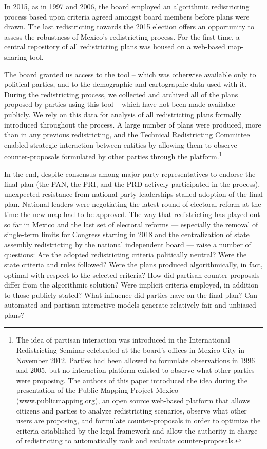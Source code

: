\documentclass[letter,12pt]{article}
\begin{document}
In 2015, as in 1997 and 2006, the board employed an algorithmic redistricting process based upon criteria agreed amongst board members before plans were drawn. The last redistricting towards the 2015 election offers an opportunity to assess the robustness of Mexico's redistricting process. For the first time, a central repository of all redistricting plans was housed on a web-based map-sharing tool. 

The board granted us access to the tool -- which was otherwise available only to political parties, and to the demographic and cartographic data used with it. During the redistricting process, we collected and archived all of the plans proposed by parties using this tool -- which have not been made available publicly. We rely on this data for analysis of all redistricting plans formally introduced throughout the process. A large number of plans were produced, more than in any previous redistricting, and the Technical Redistricting Committee enabled strategic interaction between entities by allowing them to observe counter-proposals formulated by other parties through the platform.\footnote{The idea of partisan interaction was introduced in the International Redistricting Seminar celebrated at the board's offices in Mexico City in November 2012. Parties had been allowed to formulate observations in 1996 and 2005, but no interaction platform existed to observe what other parties were proposing. The authors of this paper introduced the idea during the presentation of the Public Mapping Project Mexico (\url{www.publicmapping.org}), an open source web-based platform that allows citizens and parties to analyze redistricting scenarios, observe what other users are proposing, and formulate counter-proposals in order to optimize the criteria established by the legal framework and allow the authority in charge of redistricting to automatically rank and evaluate counter-proposals.} 

In the end, despite consensus among major party representatives to endorse the final plan (the PAN, the PRI, and the PRD actively participated in the process), unexpected resistance from national party leaderships stalled adoption of the final plan. National leaders were negotiating the latest round of electoral reform at the time the new map had to be approved. The way that redistricting has played out so far in Mexico and the last set of electoral reforms --- especially the removal of single-term limits for Congress starting in 2018 and the centralization of state assembly redistricting by the national independent board --- raise a number of questions: Are the adopted redistricting criteria politically neutral? Were the state criteria and rules followed? Were the plans produced algorithmically, in fact, optimal with respect to the selected criteria? How did partisan counter-proposals differ from the algorithmic solution? Were implicit criteria employed, in addition to those publicly stated? What influence did parties have on the final plan? Can automated and partisan interactive  models generate relatively fair and unbiased plans?
\end{document}
